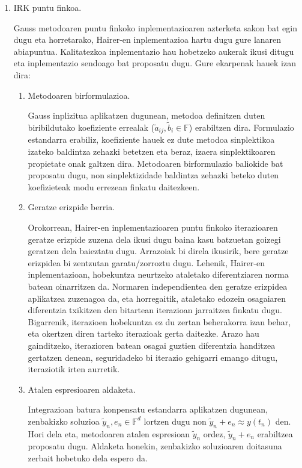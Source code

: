 \begin{enumerate}
\item IRK puntu finkoa.

Gauss metodoaren puntu finkoko inplementazioaren azterketa sakon bat egin dugu eta horretarako, Hairer-en inplementazioa \cite{Hairer2008} hartu dugu gure lanaren abiapuntua. Kalitatezkoa inplementazio hau hobetzeko aukerak ikusi ditugu eta inplementazio sendoago bat proposatu dugu. Gure ekarpenak hauek izan dira:  

\begin{enumerate}
\item Metodoaren birformulazioa.

Gauss inplizitua aplikatzen dugunean, metodoa definitzen duten biribildutako koefiziente errealak ($\tilde{a}_{ij}, \tilde{b}_i \in \mathbb{F}$) erabiltzen dira. Formulazio estandarra erabiliz, koefiziente hauek ez dute metodoa sinplektikoa izateko baldintza zehazki betetzen eta beraz, izaera sinplektikoaren propietate onak galtzen dira. Metodoaren birformulazio baliokide bat proposatu dugu, non sinplektizidade baldintza zehazki beteko duten koefizieteak modu errezean finkatu daitezkeen.

\item Geratze erizpide berria.

Orokorrean, Hairer-en inplementazioaren puntu finkoko iterazioaren geratze erizpide zuzena dela ikusi dugu baina kasu batzuetan goizegi geratzen dela baieztatu dugu. Arrazoiak bi direla ikusirik, bere geratze erizpidea bi zentzutan garatu/zorroztu dugu. Lehenik, Hairer-en inplementazioan, hobekuntza neurtzeko ataletako diferentziaren norma batean oinarritzen da. Normaren independientea den geratze erizpidea aplikatzea zuzenagoa da, eta horregaitik, ataletako edozein osagaiaren diferentzia txikitzen den bitartean iterazioan jarraitzea finkatu dugu. Bigarrenik, iterazioen hobekuntza ez du zertan beherakorra izan behar, eta okertzen diren tarteko iterazioak gerta daitezke. Arazo hau gainditzeko, iterazioren batean osagai guztien diferentzia handitzea gertatzen denean, seguridadeko bi iterazio gehigarri emango ditugu, iteraziotik irten aurretik.   

\item Atalen espresioaren aldaketa.

Integrazioan batura konpensatu estandarra aplikatzen dugunean, zenbakizko soluzioa $\tilde{y}_n, e_n \in \mathbb{F}^d$ lortzen dugu non $\tilde{y}_n+e_n \approx y(t_n)$ den. Hori dela eta, metodoaren atalen espresioan $\tilde{y}_n$ ordez, $\tilde{y}_n+e_n$ erabiltzea proposatu dugu. Aldaketa honekin, zenbakizko soluzioaren doitasuna zerbait hobetuko dela espero da.


\end{enumerate}
\end{enumerate}
